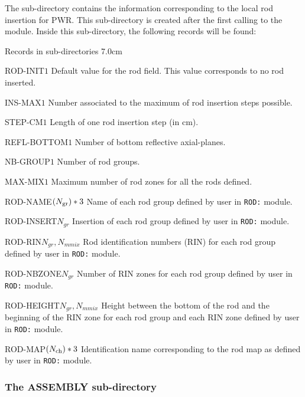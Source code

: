 The  sub-directory contains the information corresponding
to the local rod insertion for PWR. This sub-directory is created after the first calling to the  module. Inside this sub-directory,
the following records will be found:

\begin{DescriptionEnregistrement}{Records in  sub-directories}
{7.0cm} \label{tabl:tabrodinfo}

\RealEnr
 {ROD-INIT}{$1$}{} {Default value for the rod field. This value corresponds to no rod inserted.}

\IntEnr
 {INS-MAX}{$1$} {Number associated to the maximum of rod insertion steps possible.}

\RealEnr
 {STEP-CM}{$1$}{} {Length of one rod insertion step (in cm).}

\IntEnr
 {REFL-BOTTOM}{$1$} {Number of bottom reflective axial-planes.}

\IntEnr
 {NB-GROUP}{$1$} {Number of rod groups.}

\IntEnr
 {MAX-MIX}{$1$} {Maximum number of rod zones for all the rods defined.}

\OptCharEnr
 {ROD-NAME}{$(N_{\rm gr})*3$}{}
 {Name of each rod group defined by user in {\tt ROD:} module.}

\IntEnr
 {ROD-INSERT}{$N_{gr}$} {Insertion of each rod group defined by user in {\tt ROD:} module.}

\RealEnr
 {ROD-RIN}{$N_{gr}, N_{mmix}$}{} {Rod identification numbers (RIN) for each rod group defined by user in {\tt ROD:} module.}

\IntEnr
 {ROD-NBZONE}{$N_{gr}$} {Number of RIN zones for each rod group defined by user in {\tt ROD:} module.}

\RealEnr
 {ROD-HEIGHT}{$N_{gr}, N_{mmix}$}{}
 {Height between the bottom of the rod and the beginning of the RIN zone for each rod group and each RIN zone defined by user in {\tt ROD:} module.}

\OptCharEnr
 {ROD-MAP}{$(N_{\rm ch})*3$}{}
 {Identification name corresponding to the rod map as defined by user
 in {\tt ROD:} module.}

\end{DescriptionEnregistrement}

\subsubsection{The ASSEMBLY sub-directory}\label{sect:fmapdirass}

